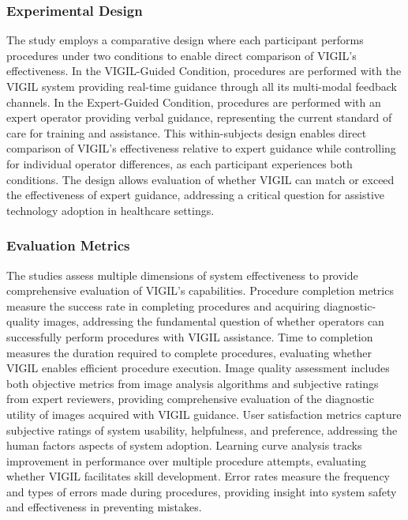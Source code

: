 \documentclass[12pt,a4paper]{article}
\begin{document}
\subsubsection{Experimental Design}

The study employs a comparative design where each participant performs procedures under two conditions to enable direct comparison of VIGIL's effectiveness. In the VIGIL-Guided Condition, procedures are performed with the VIGIL system providing real-time guidance through all its multi-modal feedback channels. In the Expert-Guided Condition, procedures are performed with an expert operator providing verbal guidance, representing the current standard of care for training and assistance. This within-subjects design enables direct comparison of VIGIL's effectiveness relative to expert guidance while controlling for individual operator differences, as each participant experiences both conditions. The design allows evaluation of whether VIGIL can match or exceed the effectiveness of expert guidance, addressing a critical question for assistive technology adoption in healthcare settings.

\subsubsection{Evaluation Metrics}

The studies assess multiple dimensions of system effectiveness to provide comprehensive evaluation of VIGIL's capabilities. Procedure completion metrics measure the success rate in completing procedures and acquiring diagnostic-quality images, addressing the fundamental question of whether operators can successfully perform procedures with VIGIL assistance. Time to completion measures the duration required to complete procedures, evaluating whether VIGIL enables efficient procedure execution. Image quality assessment includes both objective metrics from image analysis algorithms and subjective ratings from expert reviewers, providing comprehensive evaluation of the diagnostic utility of images acquired with VIGIL guidance. User satisfaction metrics capture subjective ratings of system usability, helpfulness, and preference, addressing the human factors aspects of system adoption. Learning curve analysis tracks improvement in performance over multiple procedure attempts, evaluating whether VIGIL facilitates skill development. Error rates measure the frequency and types of errors made during procedures, providing insight into system safety and effectiveness in preventing mistakes.
\end{document}
